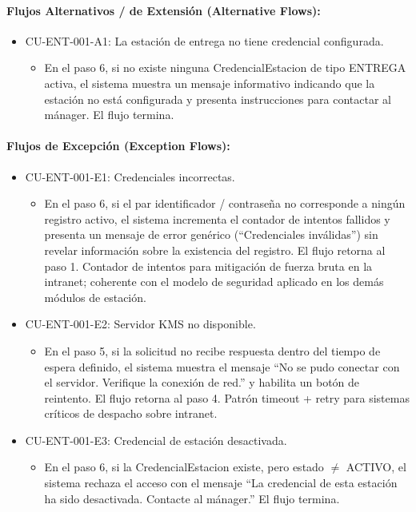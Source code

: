 \paragraph{Flujos Alternativos / de Extensión (Alternative Flows):}
\begin{itemize}
    \item CU-ENT-001-A1: La estación de entrega no tiene credencial configurada.
    \begin{itemize}
        \item En el paso 6, si no existe ninguna CredencialEstacion de tipo ENTREGA activa, el sistema muestra un mensaje informativo indicando que la estación no está configurada y presenta instrucciones para contactar al mánager. El flujo termina.
    \end{itemize}
\end{itemize}

\paragraph{Flujos de Excepción (Exception Flows):}
\begin{itemize}
    \item CU-ENT-001-E1: Credenciales incorrectas.
    \begin{itemize}
        \item En el paso 6, si el par identificador / contraseña no corresponde a ningún registro activo, el sistema incrementa el contador de intentos fallidos y presenta un mensaje de error genérico (``Credenciales inválidas'') sin revelar información sobre la existencia del registro. El flujo retorna al paso 1. Contador de intentos para mitigación de fuerza bruta en la intranet; coherente con el modelo de seguridad aplicado en los demás módulos de estación.
    \end{itemize}
    \item CU-ENT-001-E2: Servidor KMS no disponible.
    \begin{itemize}
        \item En el paso 5, si la solicitud no recibe respuesta dentro del tiempo de espera definido, el sistema muestra el mensaje ``No se pudo conectar con el servidor. Verifique la conexión de red.'' y habilita un botón de reintento. El flujo retorna al paso 4. Patrón timeout + retry para sistemas críticos de despacho sobre intranet.
    \end{itemize}
    \item CU-ENT-001-E3: Credencial de estación desactivada.
    \begin{itemize}
        \item En el paso 6, si la CredencialEstacion existe, pero estado $\neq$ ACTIVO, el sistema rechaza el acceso con el mensaje ``La credencial de esta estación ha sido desactivada. Contacte al mánager.'' El flujo termina.
    \end{itemize}
\end{itemize}

